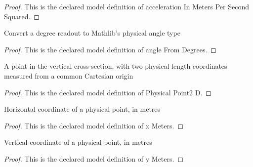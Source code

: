 \begin{proof}
  This is the declared model definition of acceleration In Meters Per Second Squared.
\end{proof}
\begin{definition}
  \label{def:physics:phyx-mini-0744:phyxminiproblems-problemphyxmini0744-anglefromdegrees}
  Convert a degree readout to Mathlib's physical angle type
\end{definition}
\begin{proof}
  This is the declared model definition of angle From Degrees.
\end{proof}
\begin{definition}
  \label{def:physics:phyx-mini-0744:phyxminiproblems-problemphyxmini0744-physicalpoint2d}
  A point in the vertical cross-section, with two physical length coordinates measured from a common Cartesian origin
\end{definition}
\begin{proof}
  This is the declared model definition of Physical Point2 D.
\end{proof}
\begin{definition}[x Meters]
  \label{def:physics:phyx-mini-0744:phyxminiproblems-problemphyxmini0744-physicalpoint2d-xmeters}
  Horizontal coordinate of a physical point, in metres
\end{definition}
\begin{proof}
  This is the declared model definition of x Meters.
\end{proof}
\begin{definition}[y Meters]
  \label{def:physics:phyx-mini-0744:phyxminiproblems-problemphyxmini0744-physicalpoint2d-ymeters}
  Vertical coordinate of a physical point, in metres
\end{definition}
\begin{proof}
  This is the declared model definition of y Meters.
\end{proof}

